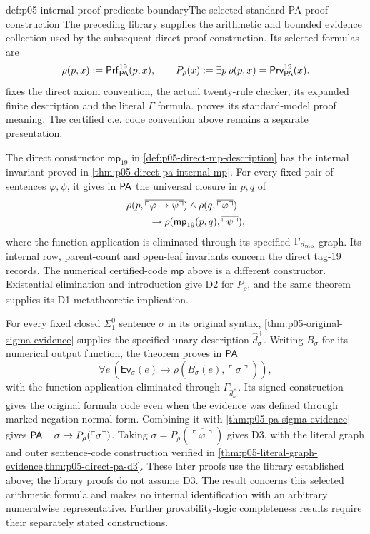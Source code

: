 \begin{proofboundary}{def:p05-internal-proof-predicate-boundary}{The selected standard PA proof construction}
The preceding library supplies the arithmetic and bounded evidence
collection used by the subsequent direct proof construction. Its selected
formulas are
\[
 \rho(p,x)\mathrel{:=}\mathsf{Prf}^{19}_{\mathsf{PA}}(p,x),\qquad
 P_\rho(x)\mathrel{:=}\exists p\,\rho(p,x)
                       =\mathsf{Prv}^{19}_{\mathsf{PA}}(x).
\]
fixes the direct axiom convention, the actual twenty-rule checker,
its expanded finite description and the literal \(\Gamma\) formula.
proves its standard-model proof meaning. The certified c.e. code convention
above remains a separate presentation.

The direct constructor \(\mathsf{mp}_{19}\) in
\cref{def:p05-direct-mp-description} has the internal invariant proved in
\cref{thm:p05-direct-pa-internal-mp}. For every fixed pair of sentences
\(\varphi,\psi\), it gives in \(\mathsf{PA}\) the universal closure in
\(p,q\) of
\[
\begin{split}
 &\rho(p,\overline{\ulcorner\varphi\to\psi\urcorner})
       \land\rho(q,\overline{\ulcorner\varphi\urcorner})\\
 &\hspace{8mm}\to
       \rho(\mathsf{mp}_{19}(p,q),\overline{\ulcorner\psi\urcorner}),
\end{split}
\]
where the function application is eliminated through its specified
\(\Gamma_{d_{\rm mp}}\) graph. Its internal row, parent-count and
open-leaf invariants concern the direct tag-19 records. The numerical
certified-code \(\mathsf{mp}\) above is a different constructor.
Existential elimination and introduction give D2 for \(P_\rho\), and
the same theorem supplies its D1 metatheoretic implication.

For every fixed closed \(\Sigma^0_1\) sentence \(\sigma\) in its
original syntax, \cref{thm:p05-original-sigma-evidence} supplies the
specified unary description \(\widehat d_\sigma^+\). Writing
\(B_\sigma\) for its numerical output function, the theorem proves
in \(\mathsf{PA}\)
\[
 \forall e\,(\mathsf{Ev}_\sigma(e)\to
       \rho(B_\sigma(e),\overline{\ulcorner\sigma\urcorner})),
\]
with the function application eliminated through
\(\Gamma_{\widehat d_\sigma^+}\). Its signed construction gives the
original formula code even when the evidence was defined through marked
negation normal form. Combining it with \cref{thm:p05-pa-sigma-evidence}
gives
\(\mathsf{PA}\vdash\sigma\to P_\rho(\overline{\ulcorner\sigma\urcorner})\).
Taking \(\sigma=P_\rho(\overline{\ulcorner\varphi\urcorner})\)
gives D3, with the literal graph and outer sentence-code construction
verified in \cref{thm:p05-literal-graph-evidence,thm:p05-direct-pa-d3}.
These later proofs use the library established above; the library proofs
do not assume D3. The result concerns this selected arithmetic formula
and makes no internal identification with an arbitrary numeralwise
representative. Further provability-logic completeness results require
their separately stated constructions.
\end{proofboundary}
